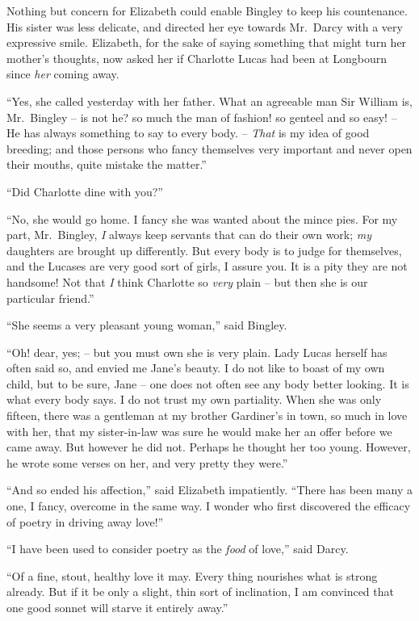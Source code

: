 Nothing but concern for Elizabeth could enable Bingley
to keep his countenance. His sister was less delicate, and
directed her eye towards Mr.\ Darcy with a very expressive
smile. Elizabeth, for the sake of saying something that
might turn her mother’s thoughts, now asked her if Charlotte
Lucas had been at Longbourn since \textit{her} coming away.

“Yes, she called yesterday with her father. What an
agreeable man Sir William is, Mr.\ Bingley -- is not he?
so much the man of fashion! so genteel and so easy! -- He
has always something to say to every body. -- \textit{That} is
my idea of good breeding; and those persons who fancy
themselves very important and never open their mouths,
quite mistake the matter.”

“Did Charlotte dine with you?”

“No, she would go home. I fancy she was wanted
about the mince pies. For my part, Mr.\ Bingley, \textit{I} always
keep servants that can do their own work; \textit{my} daughters
are brought up differently. But every body is to judge
for themselves, and the Lucases are very good sort of
girls, I assure you. It is a pity they are not handsome!
Not that \textit{I} think Charlotte so \textit{very} plain -- but then she is
our particular friend.”

“She seems a very pleasant young woman,” said
Bingley.

“Oh! dear, yes; -- but you must own she is very plain.
Lady Lucas herself has often said so, and envied me
Jane’s beauty. I do not like to boast of my own child,
but to be sure, Jane -- one does not often see any body
better looking. It is what every body says. I do not
trust my own partiality. When she was only fifteen,
there was a gentleman at my brother Gardiner’s in town,
so much in love with her, that my sister-in-law was sure
he would make her an offer before we came away. But
however he did not. Perhaps he thought her too young.
However, he wrote some verses on her, and very pretty
they were.”

“And so ended his affection,” said Elizabeth impatiently.
“There has been many a one, I fancy, overcome
in the same way. I wonder who first discovered
the efficacy of poetry in driving away love!”

“I have been used to consider poetry as the \textit{food} of
love,” said Darcy.

“Of a fine, stout, healthy love it may. Every thing
nourishes what is strong already. But if it be only a
slight, thin sort of inclination, I am convinced that one
good sonnet will starve it entirely away.”

